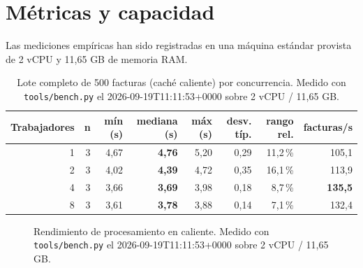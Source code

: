 \documentclass[11pt,a4paper]{article}
\begin{document}
\section{Métricas y capacidad}

Las mediciones empíricas han sido registradas en una máquina estándar provista de 2 vCPU y 11,65 GB de memoria RAM.

\begin{table}[htbp]
\centering
\begin{tabular}{rrrrrrrr}
\toprule
\textbf{Trabajadores} & \textbf{n} & \textbf{mín (s)} & \textbf{mediana (s)} & \textbf{máx (s)} & \textbf{desv. típ.} & \textbf{rango rel.} & \textbf{facturas/s} \\
\midrule
1 & 3 & 4,67 & \textbf{4,76} & 5,20 & 0,29 & 11,2\,\% & 105,1 \\
2 & 3 & 4,02 & \textbf{4,39} & 4,72 & 0,35 & 16,1\,\% & 113,9 \\
4 & 3 & 3,66 & \textbf{3,69} & 3,98 & 0,18 &  8,7\,\% & \textbf{135,5} \\
8 & 3 & 3,61 & \textbf{3,78} & 3,88 & 0,14 &  7,1\,\% & 132,4 \\
\bottomrule
\end{tabular}
\caption{Lote completo de 500 facturas (caché caliente) por concurrencia. Medido con \texttt{tools/bench.py} el 2026-09-19T11:11:53+0000 sobre 2 vCPU / 11,65 GB.}
\end{table}

\begin{figure}[htbp]
\centering
{}
\caption{Rendimiento de procesamiento en caliente. Medido con \texttt{tools/bench.py} el 2026-09-19T11:11:53+0000 sobre 2 vCPU / 11,65 GB.}
\end{figure}
\end{document}
